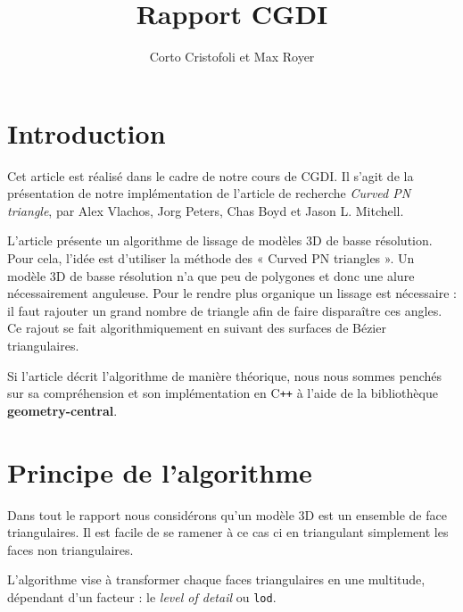 \documentclass{article}
\title{Rapport CGDI}
\author{Corto Cristofoli et Max Royer}
\def\Cpp{C\texttt{++} }
\begin{document}
\maketitle



\section{Introduction}
Cet article est réalisé dans le cadre de notre cours de CGDI.
Il s'agit de la présentation de notre implémentation de l'article
de recherche \textit{Curved PN triangle}, par Alex Vlachos, Jorg Peters,
Chas Boyd et Jason L. Mitchell.

L'article présente un algorithme de lissage de modèles 3D de basse résolution.
Pour cela, l'idée est d'utiliser la méthode des « Curved PN triangles ». Un
modèle 3D de basse résolution n'a que peu de polygones et donc une alure
nécessairement anguleuse. Pour le rendre plus organique un lissage est
nécessaire : il faut rajouter un grand nombre de triangle afin de faire
disparaître ces angles. Ce rajout se fait algorithmiquement en suivant des
surfaces de Bézier triangulaires.

Si l'article décrit l'algorithme de manière théorique, nous nous sommes penchés
sur sa compréhension et son implémentation en \Cpp à l'aide de la
bibliothèque \textbf{geometry-central}.


\section{Principe de l'algorithme}
Dans tout le rapport nous considérons qu'un modèle 3D est un ensemble de face
triangulaires. Il est facile de se ramener à ce cas ci en triangulant
simplement les faces non triangulaires.

L'algorithme vise à transformer chaque faces triangulaires en une multitude,
dépendant d'un facteur : le \textit{level of detail} ou \texttt{lod}.
\end{document}
